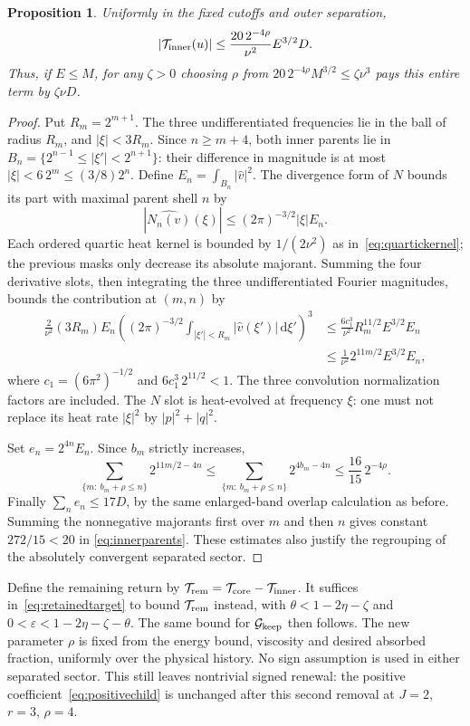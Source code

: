\documentclass[11pt]{article}
\newtheorem{proposition}{Proposition}
\newcommand{\dd}{\,\mathrm d}
\begin{document}
\begin{proposition}\label{prop:innerparents}
Uniformly in the fixed cutoffs and outer separation,
\begin{equation}\label{eq:innerparents}
 |\mathcal T_{\rm inner}(u)|
 \leq \frac{20\,2^{-4\rho}}{\nu^2}E^{3/2}D.
\end{equation}
Thus, if $E\leq M$, for any $\zeta>0$ choosing $\rho$ from
$20\,2^{-4\rho}M^{3/2}\leq\zeta\nu^3$ pays this entire term by
$\zeta\nu D$.
\end{proposition}
\begin{proof}
Put $R_m=2^{m+1}$. The three undifferentiated frequencies lie in
the ball of radius $R_m$, and $|\xi|<3R_m$. Since $n\geq m+4$,
both inner parents lie in
$B_n=\{2^{n-1}\leq|\xi'|<2^{n+1}\}$:
their difference in magnitude is at most
$|\xi|<6\,2^m\leq(3/8)2^n$. Define
$E_n=\int_{B_n}|\widehat v|^2$.
The divergence form of $N$ bounds its part with maximal parent shell
$n$ by
\[
 |\widehat{N_n(v)}(\xi)|
 \leq(2\pi)^{-3/2}|\xi|E_n.
\]
Each ordered quartic heat kernel is bounded by $1/(2\nu^2)$
as in~\eqref{eq:quartickernel}; the previous masks only decrease its
absolute majorant. Summing the four derivative slots, then integrating
the three undifferentiated Fourier magnitudes, bounds the contribution
at $(m,n)$ by
\begin{align*}
 \frac2{\nu^2}(3R_m)E_n
 \left((2\pi)^{-3/2}\int_{|\xi'|<R_m}
                                  |\widehat v(\xi')|\dd\xi'\right)^3
 &\leq \frac{6c_1^3}{\nu^2}R_m^{11/2}E^{3/2}E_n\\
 &\leq \frac1{\nu^2}2^{11m/2}E^{3/2}E_n,
\end{align*}
where $c_1=(6\pi^2)^{-1/2}$ and
$6c_1^3\,2^{11/2}<1$. The three convolution normalization factors
are included. The $N$ slot is heat-evolved at frequency $\xi$:
one must not replace its heat rate $|\xi|^2$ by $|p|^2+|q|^2$.

Set $e_n=2^{4n}E_n$. Since $b_m$ strictly increases,
\[
 \sum_{\{m:\ b_m+\rho\leq n\}}
       2^{11m/2-4n}
 \leq\sum_{\{m:\ b_m+\rho\leq n\}}2^{4b_m-4n}
 \leq\frac{16}{15}\,2^{-4\rho}.
\]
Finally $\sum_n e_n\leq17D$, by the same enlarged-band overlap
calculation as before. Summing the nonnegative majorants first over
$m$ and then $n$ gives constant $272/15<20$ in
\eqref{eq:innerparents}. These estimates also justify the regrouping
of the absolutely convergent separated sector.
\end{proof}

Define the remaining return by
$\mathcal T_{\rm rem}=\mathcal T_{\rm core}-\mathcal T_{\rm inner}$.
It suffices in~\eqref{eq:retainedtarget} to bound $\mathcal T_{\rm rem}$
instead, with
$\theta<1-2\eta-\zeta$ and
$0<\varepsilon<1-2\eta-\zeta-\theta$. The same bound for
$\mathcal G_{\rm keep}$ then follows. The new parameter $\rho$ is
fixed from the energy bound, viscosity and desired absorbed fraction,
uniformly over the physical history. No sign assumption is used in
either separated sector. This still leaves nontrivial signed renewal:
the positive coefficient~\eqref{eq:positivechild} is unchanged after
this second removal at $J=2$, $r=3$, $\rho=4$.
\end{document}
